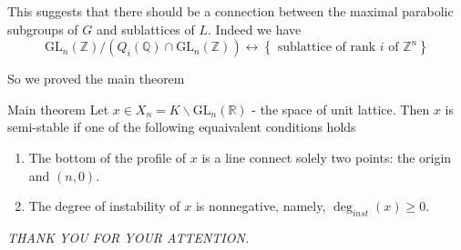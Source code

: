 \documentclass[pdf]{beamer}
\begin{document}
\begin{frame}
    This suggests that there should be a connection between the maximal parabolic subgroups of $G$
    and sublattices of $L$. Indeed we have
    \[ \text{GL}_n(\mathbb{Z})/(Q_i(\mathbb{Q}) \cap \text{GL}_n(\mathbb{Z})) \longleftrightarrow \left\lbrace \text{ sublattice of rank $i$ of $\mathbb{Z}^n$}\right\rbrace\]

    So we proved the main theorem
    \begin{block}{Main theorem}
        Let $x \in X_n = K \backslash \text{GL}_n(\mathbb{R})$ - the space of unit lattice. Then $x$ is semi-stable if one of the following equaivalent
        conditions holds
        \begin{enumerate}
            \item The bottom of the profile of $x$ is a line connect solely two points: the origin and $(n,0)$.
            \item The degree of instability of $x$ is nonnegative, namely, $\deg_{inst}(x) \ge 0$.
        \end{enumerate}
    \end{block}

\end{frame}
\begin{frame}
    \begin{center}
        \textit{THANK YOU FOR YOUR ATTENTION.}
    \end{center}
\end{frame}
\end{document}
